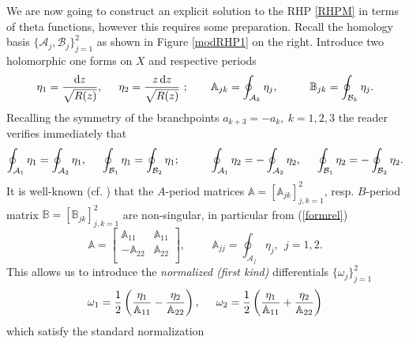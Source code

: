\documentclass[10pt,oneside,reqno]{amsart}
\numberwithin{equation}{section}
\renewcommand{\d}{{\mathrm d}}
\def\eqref#1{(\ref{#1})}
\begin{document}
We are now going to construct an explicit solution to the RHP \ref{RHPM} in terms of theta functions, however this requires some preparation. Recall the 
homology basis $\{\mathcal{A}_j,\mathcal{B}_j\}_{j=1}^2$ as shown in Figure \ref{modRHP1} on the right. Introduce two holomorphic one forms on $X$ and respective periods
\begin{equation}\label{forms}
  \eta_1 = \frac{\d z}{\sqrt{R(z)}},\hspace{0.5cm}\eta_2 = \frac{z\,\d z}{\sqrt{R(z)}}\ ;\qquad
 \mathbb{A}_{jk} = \oint_{\mathcal A_k}\eta_j,\hspace{1cm}\mathbb{B}_{jk}=\oint_{\mathcal{B}_k}\eta_j.
\end{equation}
Recalling the symmetry of the branchpoints  $a_{k+3} =-a_{k}, \ k=1,2,3$ the reader verifies immediately that 
\begin{equation}\label{formrel}
  \oint_{\mathcal{A}_1}\eta_1 = \oint_{\mathcal{A}_2}\eta_1,\hspace{0.5cm}\oint_{\mathcal{B}_1}\eta_1 = \oint_{\mathcal{B}_2}\eta_1;\hspace{1cm}
\oint_{\mathcal{A}_1}\eta_2 =-\oint_{\mathcal{A}_2}\eta_2,\hspace{0.5cm}\oint_{\mathcal{B}_1}\eta_2 = -\oint_{\mathcal{B}_2}\eta_2.
\end{equation}
It is well-known (cf. \cite{FK}) that the $A$-period matrices  $\mathbb{A}=[\mathbb{A}_{jk}]_{j,k=1}^2$, resp. $B$-period matrix $\mathbb{B}=[\mathbb{B}_{jk}]_{j,k=1}^2$ are non-singular, in particular from \eqref{formrel}
\begin{equation*}
  \mathbb{A} = \begin{bmatrix}
                \mathbb{A}_{11} & \mathbb{A}_{11}\\
-\mathbb{A}_{22} & \mathbb{A}_{22}\\
               \end{bmatrix},\hspace{1cm}\mathbb{A}_{jj} = \oint_{\mathcal{A}_j}\eta_j,\ \ j=1,2.
\end{equation*}
This allows us to introduce the {\em normalized (first kind)} differentials $\{\omega_j\}_{j=1}^2$
\begin{equation}\label{cano}
  \omega_1 = \frac{1}{2}\left(\frac{\eta_1}{\mathbb{A}_{11}}-\frac{\eta_2}{\mathbb{A}_{22}}\right),\hspace{0.5cm} 
  \omega_2 = \frac{1}{2}\left(\frac{\eta_1}{\mathbb{A}_{11}}+\frac{\eta_2}{\mathbb{A}_{22}}\right)
\end{equation}
which satisfy the standard normalization
\end{document}
